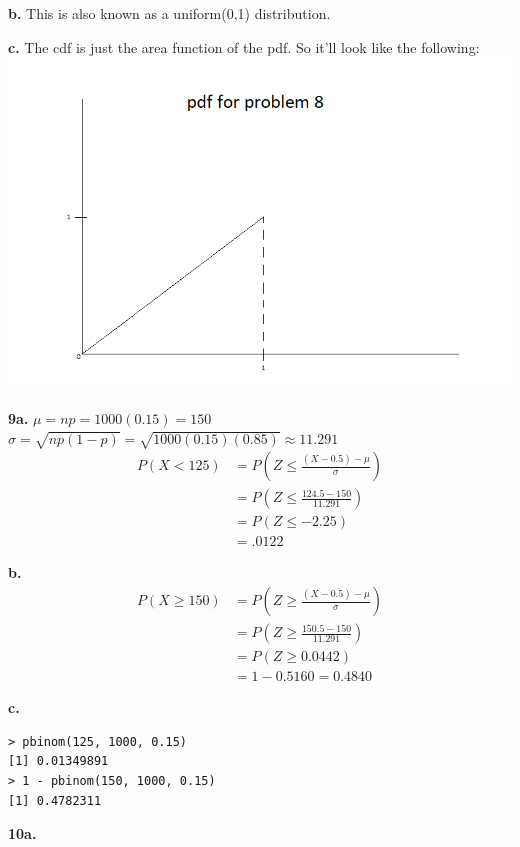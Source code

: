 \documentclass[12pt]{report}
\begin{document}
\noindent \textbf{b.} This is also known as a uniform(0,1) distribution.

\noindent \textbf{c.} The cdf is just the area function of the pdf. So it'll look like the following:\\
\includegraphics[scale = .7]{hw3_8c}

\noindent \textbf{9a.} $\mu = np = 1000(0.15) = 150$\\
$\sigma = \sqrt{np(1-p)} = \sqrt{1000(0.15)(0.85)} \approx11.291$\\

\begin{align*}
P(X < 125) &= P\left(Z \leq \frac{(X-0.5) - \mu}{\sigma}\right)\\
&= P\left(Z \leq \frac{124.5 - 150}{11.291}\right)\\
&= P(Z \leq -2.25)\\
&= \boxed{.0122}
\end{align*}

\noindent \textbf{b.} 
\begin{align*}
P(X \geq 150) &= P\left(Z \geq \frac{(X - 0.5)-\mu}{\sigma}\right)\\
&= P\left(Z \geq \frac{150.5 - 150}{11.291}\right)\\
&= P(Z \geq 0.0442)\\
&= 1 - 0.5160 = \boxed{0.4840}
\end{align*}

\noindent \textbf{c.} 
\begin{verbatim}
> pbinom(125, 1000, 0.15)
[1] 0.01349891
> 1 - pbinom(150, 1000, 0.15)
[1] 0.4782311
\end{verbatim}

\noindent \textbf{10a.}
\end{document}

